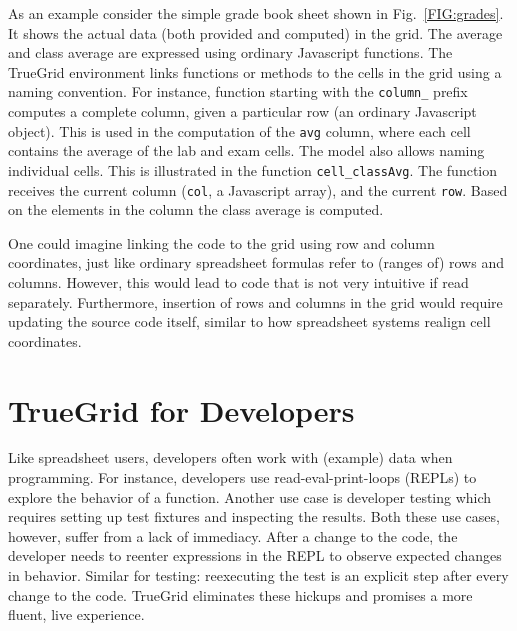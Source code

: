 \documentclass{llncs}
\begin{document}
As an example consider the simple grade book sheet shown in Fig.~\ref{FIG:grades}. It shows the actual data (both provided and computed) in the grid. The average and class average are expressed using ordinary Javascript functions. The TrueGrid environment links functions or methods to the cells in the grid using a naming convention.
For instance, function starting with the \lstinline{column_} prefix computes a complete column, given a particular row (an ordinary Javascript object).
This is used in the computation of the \lstinline{avg} column, where each cell contains the average of the lab and exam cells.
The model also allows naming individual cells. This is illustrated in the function \lstinline{cell_classAvg}. The function receives the current column (\lstinline{col}, a Javascript array), and the current \lstinline{row}. Based on the elements in the column the class average is computed. 

One could imagine linking the code to the grid using row and column coordinates, just like ordinary spreadsheet formulas refer to (ranges of) rows and columns. However, this would lead to code that is not very intuitive if read separately. Furthermore,  insertion of rows and columns in the grid would require updating the source code itself, similar to how spreadsheet systems realign cell coordinates. 


\section{TrueGrid for Developers}
\label{SECT:dev} 

Like spreadsheet users, developers often work with (example) data when programming. For instance, developers use read-eval-print-loops (REPLs) to explore the behavior of a function. 
Another use case is developer testing which requires setting up test fixtures and inspecting the results.
Both these use cases, however, suffer from a lack of immediacy. After a change to the code, the developer needs to reenter expressions in the REPL to observe expected changes in behavior. Similar for testing: reexecuting the test is an explicit step after every change to the code. TrueGrid  eliminates these hickups and promises a more fluent, live experience. 
\end{document}
